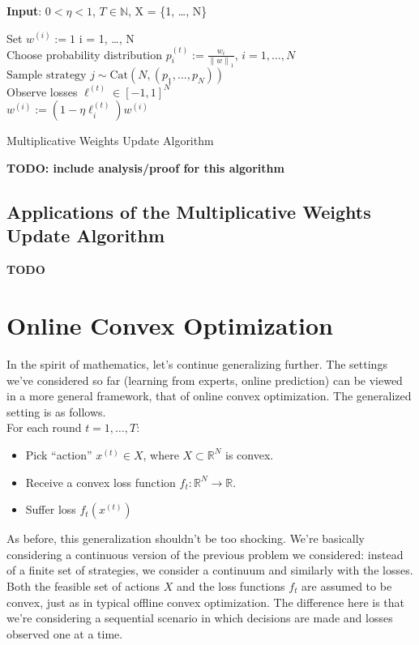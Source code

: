 \documentclass[12pt]{article}
\newcommand*{\norm}[1]{\left\lVert#1\right\rVert}
\newcommand{\R}{\mathcal{R}}
\def\R{\mathbb{R}}
\begin{document}
 \begin{algorithm}[H]
	\SetAlgoLined
	
	\textbf{Input}: $0 < \eta < 1$, $T \in \mathbb{N}$,  X = \{1, \dots, N\} \\
	
	\bigskip
	
	Set $w^{(i)} := 1$  i = 1, \dots, N \\
	
	 {
		Choose probability distribution $p^{(t)}_i := \frac{w_i}{\norm{w}_1}$, $i = 1, \dots, N$ \\
		$\text{Sample strategy } j \sim \text{Cat}(N, (p_1, \dots, p_N))$ \\
		Observe losses $\ell^{(t)} \in [-1, 1]^N$ \\
		
		 {
			$w^{(i)} := (1 - \eta \ell_i^{(t)})w^{(i)}$ \\
		}
	}			
\caption{Multiplicative Weights Update Algorithm}
\end{algorithm}

\bigskip

\textbf{TODO: include analysis/proof for this algorithm}

\subsection{Applications of the Multiplicative Weights Update Algorithm}
\textbf{TODO}



\section{Online Convex Optimization}
In the spirit of mathematics, let's continue generalizing further. The settings we've considered so far (learning from experts, online prediction) can be viewed 
in a more general framework, that of online convex optimization. The generalized setting is as follows. \\
For each round $t = 1, \dots, T$:
\begin{itemize}
\item Pick ``action'' $x^{(t)} \in X$, where $X \subset \R^N$ is convex.
\item Receive a convex loss function $f_t: \R^N \to \R$. 
\item Suffer loss $f_t(x^{(t)})$
\end{itemize}
As before, this generalization shouldn't be too shocking. We're basically considering a continuous version of the previous problem we considered: instead of a finite 
set of strategies, we consider a continuum and similarly with the losses. Both the feasible set of actions $X$ and the loss functions $f_t$ are assumed to be convex, just 
as in typical offline convex optimization. The difference here is that we're considering a sequential scenario in which decisions are made and losses observed one at a time. 
\end{document}
